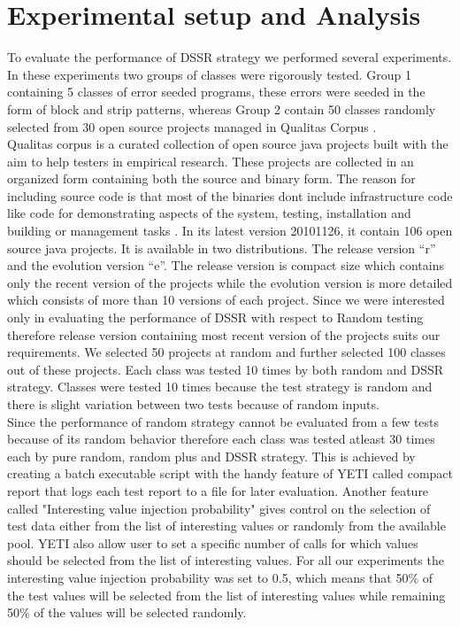 
\section{Experimental setup and Analysis}

To evaluate the performance of DSSR strategy we performed several experiments. In these experiments two groups of classes were rigorously tested. Group 1 containing 5 classes of error seeded programs, these errors were seeded in the form of block and strip patterns, whereas Group 2 contain 50 classes randomly selected from 30 open source projects managed in Qualitas Corpus \cite{Tempero2010a}. \\

Qualitas corpus is a curated collection of open source java projects built with the aim to help testers in empirical research. These projects are collected in an organized form containing both the source and binary form. The reason for including source code is that most of the binaries dont include infrastructure code like code for demonstrating aspects of the system, testing, installation and building or management tasks \cite{Tempero2010a}. In its latest version 20101126, it contain 106 open source java projects. It is available in two distributions. The release version “r” and the evolution version “e”. The release version is compact size which contains only the recent version of the projects while the evolution version is more detailed which consists of more than 10 versions of each project. Since we were interested only in evaluating the performance of DSSR with respect to Random testing therefore release version containing most recent version of the projects suits our requirements. We selected 50 projects at random and further selected 100 classes out of these projects. Each class was tested 10 times by both random and DSSR strategy. Classes were tested 10 times because the test strategy is random and there is slight variation between two tests because of random inputs.\\

Since the performance of random strategy cannot be evaluated from a few tests because of its random behavior therefore each class was tested atleast 30 times each by pure random, random plus and DSSR strategy. This is achieved by creating a batch executable script with the handy feature of YETI called compact report that logs each test report to a file for later evaluation. Another feature called "Interesting value injection probability" gives control on the selection of test data either from the list of interesting values or randomly from the available pool. YETI also allow user to set a specific number of calls for which values should be selected from the list of interesting values. For all our experiments the interesting value injection probability was set to 0.5, which means that 50\% of the test values will be selected from the list of interesting values while remaining 50\% of the values will be selected randomly.\\

